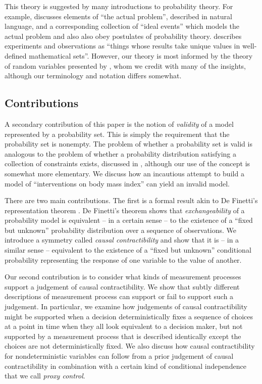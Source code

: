 \documentclass{article}
\theoremstyle{plain}
\theoremstyle{definition}
\begin{document}
This theory is suggested by many introductions to probability theory. For example, \citet{boole_theory_1862} discusses elements of ``the actual problem'', described in natural language, and a corresponding collection of ``ideal events'' which models the actual problem and also also obey postulates of probability theory. \citet{feller_introduction_1968} describes experiments and observations as ``things whose results take unique values in well-defined mathematical sets''. However, our theory is most informed by the theory of random variables presented by \citet{menger_random_2003}, whom we credit with many of the insights, although our terminology and notation differs somewhat.

\subsection{Contributions}

A secondary contribution of this paper is the notion of \emph{validity} of a model represented by a probability set. This is simply the requirement that the probability set is nonempty. The problem of whether a probability set is valid is analogous to the problem of whether a probability distribution satisfying a collection of constraints exists, discussed in \citet{vorobev_consistent_1962}, although our use of the concept is somewhat more elementary. We discuss how an incautious attempt to build a model of ``interventions on body mass index'' can yield an invalid model.

There are two main contributions. The first is a formal result akin to De Finetti's representation theorem \citep{de_finetti_foresight_1992}. De Finetti's theorem shows that \emph{exchangeability} of a probability model is equivalent -- in a certain sense -- to the existence of a ``fixed but unknown'' probability distribution over a sequence of observations. We introduce a symmetry called \emph{causal contractibility} and show that it is -- in a similar sense -- equivalent to the existence of a ``fixed but unknown'' conditional probability representing the response of one variable to the value of another.

Our second contribution is to consider what kinds of measurement processes support a judgement of causal contractibility. We show that subtly different descriptions of measurement process can support or fail to support such a judgement. In particular, we examine how judgements of causal contractibility might be supported when a decision deterministically fixes a sequence of choices at a point in time when they all look equivalent to a decision maker, but not supported by a measurement process that is described identically except the choices are not deterministically fixed. We also discuss how causal contractibility for nondeterministic variables can follow from a prior judgement of causal contractibility in combination with a certain kind of conditional independence that we call \emph{proxy control}.
\end{document}
